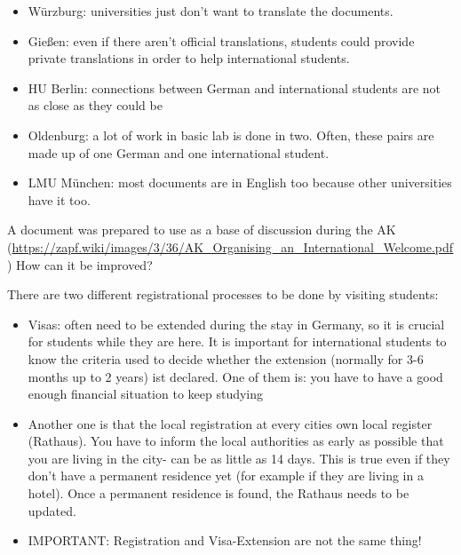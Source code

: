 \begin{itemize}
      \item Würzburg: universities just don't want to translate the documents.
      \item Gießen: even if there aren't official translations, students could provide private translations in order to help international students.
      \item HU Berlin: connections between German and international students are not as close as they could be
      \item Oldenburg: a lot of work in basic lab is done in two. Often, these pairs are made up of one German and one international student.
      \item LMU München: most documents are in English too because other universities have it too.
    \end{itemize}

    A document was prepared to use as a base of discussion during the AK (\url{https://zapf.wiki/images/3/36/AK_Organising_an_International_Welcome.pdf})
    How can it be improved?

    There are two different registrational processes to be done by visiting students:
    \begin{itemize}
      \item Visas: often need to be extended during the stay in Germany, so it is crucial for students while they are here. It is important for international students to know the criteria used to decide whether the extension (normally for 3-6 months up to 2 years) ist declared. One of them is: you have to have a good enough financial situation to keep studying
      \item Another one is that the local registration at every cities own local register (Rathaus). You have to inform the local authorities as early as possible that you are living in the city- can be as little as 14 days. This is true even if they don't have a permanent residence yet (for example if they are living in a hotel). Once a permanent residence is found, the Rathaus needs to be updated.
      \item IMPORTANT: Registration and Visa-Extension are not the same thing!
    \end{itemize}


